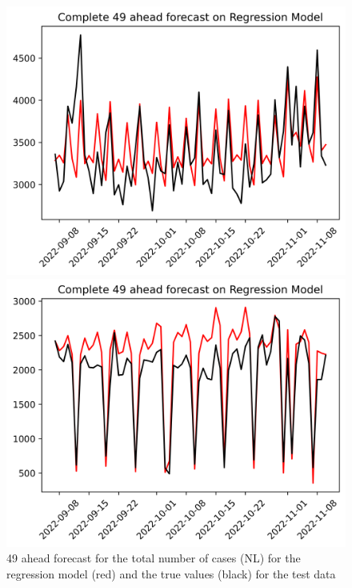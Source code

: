 \begin{figure}

\begin{minipage}{.32\textwidth}
  \centering
  \includegraphics[width=\linewidth]{pics/49_ah/Complete_49_ahead_Regression Model.png}
  \caption{49 ahead forecast for the total number of cases (NL) for the regression model (red) and the true values (black) for the test data}
  \label{fig:tot_cases_fc_49_RM}
\end{minipage}
\begin{minipage}{.32\textwidth}
  \centering
  \includegraphics[width=\linewidth]{pics/49_ah/DE_Complete_49_ahead_Regression Model.png}

\end{minipage}
\end{figure}
